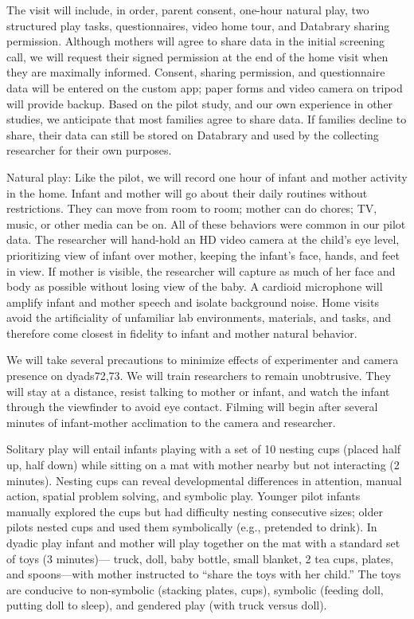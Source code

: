 \documentclass[english,man]{apa6}
\theoremstyle{definition}
\theoremstyle{definition}
\theoremstyle{definition}
\theoremstyle{remark}
\begin{document}
The visit will include, in order, parent consent, one-hour natural play,
two structured play tasks, questionnaires, video home tour, and
Databrary sharing permission. Although mothers will agree to share data
in the initial screening call, we will request their signed permission
at the end of the home visit when they are maximally informed. Consent,
sharing permission, and questionnaire data will be entered on the custom
app; paper forms and video camera on tripod will provide backup. Based
on the pilot study, and our own experience in other studies, we
anticipate that most families agree to share data. If families decline
to share, their data can still be stored on Databrary and used by the
collecting researcher for their own purposes.

Natural play: Like the pilot, we will record one hour of infant and
mother activity in the home. Infant and mother will go about their daily
routines without restrictions. They can move from room to room; mother
can do chores; TV, music, or other media can be on. All of these
behaviors were common in our pilot data. The researcher will hand-hold
an HD video camera at the child's eye level, prioritizing view of infant
over mother, keeping the infant's face, hands, and feet in view. If
mother is visible, the researcher will capture as much of her face and
body as possible without losing view of the baby. A cardioid microphone
will amplify infant and mother speech and isolate background noise. Home
visits avoid the artificiality of unfamiliar lab environments,
materials, and tasks, and therefore come closest in fidelity to infant
and mother natural behavior.

We will take several precautions to minimize effects of experimenter and
camera presence on dyads72,73. We will train researchers to remain
unobtrusive. They will stay at a distance, resist talking to mother or
infant, and watch the infant through the viewfinder to avoid eye
contact. Filming will begin after several minutes of infant-mother
acclimation to the camera and researcher.

Solitary play will entail infants playing with a set of 10 nesting cups
(placed half up, half down) while sitting on a mat with mother nearby
but not interacting (2 minutes). Nesting cups can reveal developmental
differences in attention, manual action, spatial problem solving, and
symbolic play. Younger pilot infants manually explored the cups but had
difficulty nesting consecutive sizes; older pilots nested cups and used
them symbolically (e.g., pretended to drink). In dyadic play infant and
mother will play together on the mat with a standard set of toys (3
minutes)--- truck, doll, baby bottle, small blanket, 2 tea cups, plates,
and spoons---with mother instructed to \enquote{share the toys with her
child.} The toys are conducive to non-symbolic (stacking plates, cups),
symbolic (feeding doll, putting doll to sleep), and gendered play (with
truck versus doll).
\end{document}
